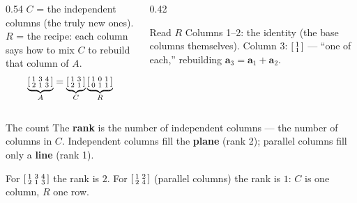 \documentclass[aspectratio=169, 11pt]{beamer}
\begin{document}
\begin{frame}[t, plain]
  \begin{columns}[T]
    \begin{column}{0.54\textwidth}
      \textbf{$C$} = the independent columns (the truly new ones).\\[4pt]
      \textbf{$R$} = the recipe: each column says how to mix $C$ to rebuild that column of $A$.
      \[
        \underbrace{\begin{bsmallmatrix} 1 & 3 & 4 \\ 2 & 1 & 3 \end{bsmallmatrix}}_{A}
        =\underbrace{\begin{bsmallmatrix} 1 & 3 \\ 2 & 1 \end{bsmallmatrix}}_{C}
         \underbrace{\begin{bsmallmatrix} 1 & 0 & 1 \\ 0 & 1 & 1 \end{bsmallmatrix}}_{R}
      \]
    \end{column}
    \begin{column}{0.42\textwidth}
      \begin{block}{Read $R$}
        Columns 1--2: the identity (the base columns themselves). Column 3: $\begin{bsmallmatrix} 1\\1 \end{bsmallmatrix}$ --- ``one of each,'' rebuilding $\mathbf{a}_3=\mathbf{a}_1+\mathbf{a}_2$.
      \end{block}
    \end{column}
  \end{columns}
\end{frame}

\begin{frame}[t, plain]
  \begin{block}{The count}
    The \textbf{rank} is the number of independent columns --- the number of columns in $C$.
    Independent columns fill the \textbf{plane} (rank 2); parallel columns fill only a \textbf{line} (rank 1).
  \end{block}
  For $\begin{bsmallmatrix} 1 & 3 & 4 \\ 2 & 1 & 3 \end{bsmallmatrix}$ the rank is $2$. For
  $\begin{bsmallmatrix} 1 & 2 \\ 2 & 4 \end{bsmallmatrix}$ (parallel columns) the rank is $1$: $C$ is one column, $R$ one row.
\end{frame}
\end{document}
